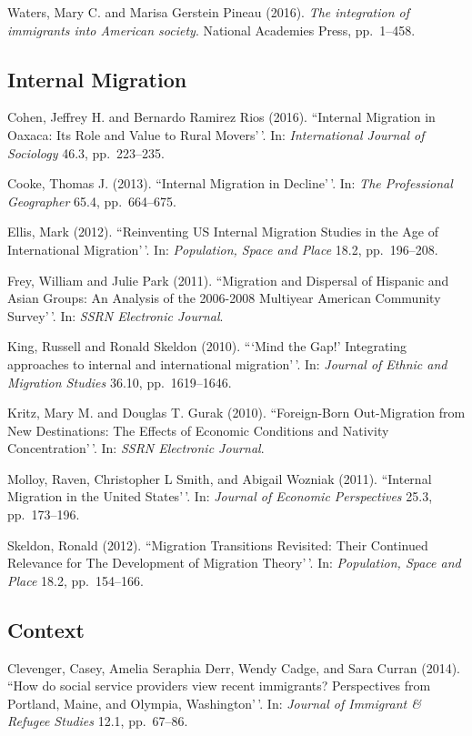 \documentclass[11pt,]{article}
\begin{document}
Waters, Mary C. and Marisa Gerstein Pineau (2016).
\emph{The integration of immigrants into American society}. National
Academies Press, pp.~1--458.

\hypertarget{internal-migration}{%
\subsection{Internal Migration}\label{internal-migration}}

Cohen, Jeffrey H. and Bernardo Ramirez Rios (2016). ``Internal Migration
in Oaxaca: Its Role and Value to Rural Movers'\,'. In:
\emph{International Journal of Sociology} 46.3, pp.~223--235.

Cooke, Thomas J. (2013). ``Internal Migration in Decline'\,'. In:
\emph{The Professional Geographer} 65.4, pp.~664--675.

Ellis, Mark (2012). ``Reinventing US Internal Migration Studies in the
Age of International Migration'\,'. In:
\emph{Population, Space and Place} 18.2, pp.~196--208.

Frey, William and Julie Park (2011). ``Migration and Dispersal of
Hispanic and Asian Groups: An Analysis of the 2006-2008 Multiyear
American Community Survey'\,'. In: \emph{SSRN Electronic Journal}.

King, Russell and Ronald Skeldon (2010). ```Mind the Gap!' Integrating
approaches to internal and international migration'\,'. In:
\emph{Journal of Ethnic and Migration Studies} 36.10, pp.~1619--1646.

Kritz, Mary M. and Douglas T. Gurak (2010). ``Foreign-Born Out-Migration
from New Destinations: The Effects of Economic Conditions and Nativity
Concentration'\,'. In: \emph{SSRN Electronic Journal}.

Molloy, Raven, Christopher L Smith, and Abigail Wozniak (2011).
``Internal Migration in the United States'\,'. In:
\emph{Journal of Economic Perspectives} 25.3, pp.~173--196.

Skeldon, Ronald (2012). ``Migration Transitions Revisited: Their
Continued Relevance for The Development of Migration Theory'\,'. In:
\emph{Population, Space and Place} 18.2, pp.~154--166.

\hypertarget{context}{%
\subsection{Context}\label{context}}

Clevenger, Casey, Amelia Seraphia Derr, Wendy Cadge, and Sara Curran
(2014). ``How do social service providers view recent immigrants?
Perspectives from Portland, Maine, and Olympia, Washington'\,'. In:
\emph{Journal of Immigrant \& Refugee Studies} 12.1, pp.~67--86.
\end{document}
